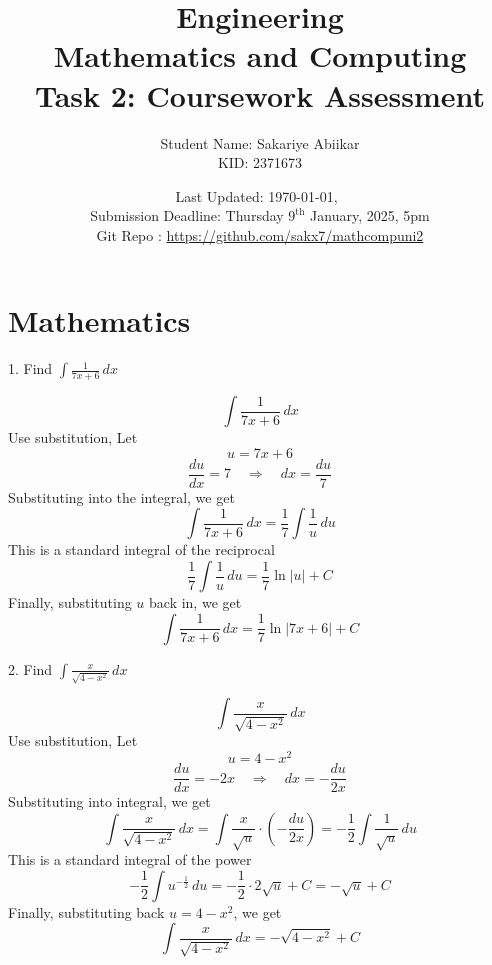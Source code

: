 \documentclass[a4paper, 12pt]{report}
\title{\vspace{3em} \Huge \textbf{Engineering\\ Mathematics and Computing}\\ \vspace{1em} \Large Task 2: Coursework Assessment}
\author{Student Name: Sakariye Abiikar\\ KID: 2371673}
\date{Last Updated: \today,\
     \currenttime\\ Submission Deadline: Thursday \(9^{\text{th}}\) January, 2025, 5pm \\[1em] Git Repo : \color{blue}\url{https://github.com/sakx7/mathcompuni2}}
\def\ni{green!60!black!40!white}
\begin{document}
    
    \maketitle
    \thispagestyle{empty}
    
    \newpage
    \thispagestyle{empty}
    
    \chapter{Mathematics}
    
    \newpage\centering\restoregeometry
    
    \setcounter{page}{1}
    
    
    \begin{tcolorbox}[title={\color{black}\section{Q1}}, colback=white, colframe=\ni, boxrule=1mm, width=1\textwidth]
        1. Find \( \int \frac{1}{7x + 6} \, dx \)
    \end{tcolorbox}
    \[\int \frac{1}{7x + 6} \, dx\]
    Use substitution, Let 
    \[u = 7x + 6\]
    \[\frac{du}{dx} = 7 \quad \Rightarrow \quad dx = \frac{du}{7}\]
    Substituting into the integral, we get
    \[\int \frac{1}{7x + 6} \, dx = \frac{1}{7} \int \frac{1}{u} \, du\]
    This is a standard integral of the reciprocal
    \[\frac{1}{7} \int \frac{1}{u} \, du = \frac{1}{7} \ln |u| + C\]
    Finally, substituting \(u\) back in, we get
    \[\boxed{\int \frac{1}{7x + 6} \, dx = \frac{1}{7} \ln |7x + 6| + C}\]
    
    
    \newpage
    
    \begin{tcolorbox}[title={\color{black}\section{Q2}}, colback=white, colframe=\ni, boxrule=1mm, width=1\textwidth]
        2. Find \( \int \frac{x}{\sqrt{4 - x^2}} \, dx \)
    \end{tcolorbox}
    
    \[\int \frac{x}{\sqrt{4 - x^2}} \, dx\]
    Use substitution, Let\\[-1.5em] 
    \[u = 4 - x^2\]
    \[\frac{du}{dx} = -2x \quad \Rightarrow \quad dx = -\frac{du}{2x}\]
    Substituting into integral, we get
    \[\int \frac{x}{\sqrt{4 - x^2}} \, dx = \int \frac{x}{\sqrt{u}} \cdot \left(-\frac{du}{2x}\right) = -\frac{1}{2} \int \frac{1}{\sqrt{u}} \, du\]
    This is a standard integral of the power
    \[-\frac{1}{2} \int u^{-\frac{1}{2}} \, du = -\frac{1}{2} \cdot 2 \sqrt{u} + C = -\sqrt{u} + C\]
    Finally, substituting back \( u = 4 - x^2 \), we get
    \[\boxed{\int \frac{x}{\sqrt{4 - x^2}} \, dx = -\sqrt{4 - x^2} + C}\]
    
\end{document}

